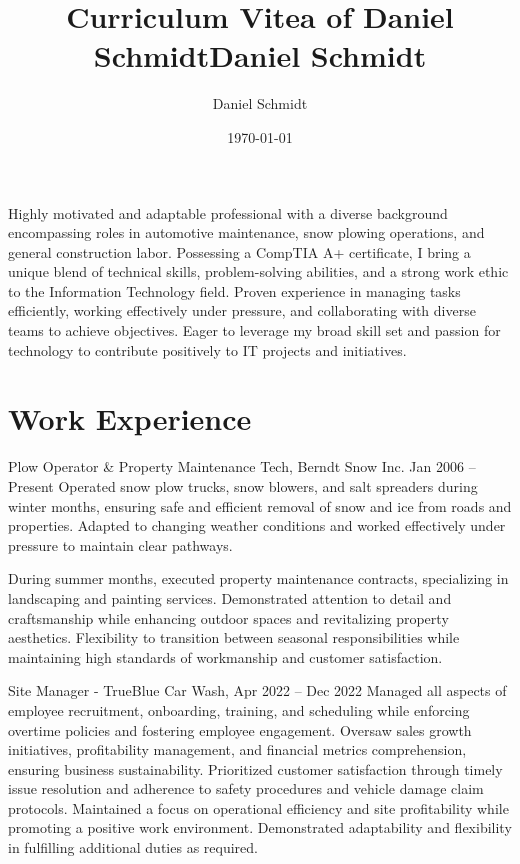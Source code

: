 \documentclass{simplecv}
\title{Curriculum Vitea of Daniel Schmidt}
\author{Daniel Schmidt}
\date{\today}
\begin{document}


\title{Daniel Schmidt}
\maketitle
Highly motivated and adaptable professional with a diverse background encompassing roles in automotive maintenance, snow plowing operations, and general construction labor. Possessing a CompTIA A+ certificate, I bring a unique blend of technical skills, problem-solving abilities, and a strong work ethic to the Information Technology field. Proven experience in managing tasks efficiently, working effectively under pressure, and collaborating with diverse teams to achieve objectives. Eager to leverage my broad skill set and passion for technology to contribute positively to IT projects and initiatives.

\section{Work Experience}
\begin{topic}
\item[Plow Operator \& Property Maintenance Tech, Berndt Snow Inc. Jan 2006 -- Present]
Operated snow plow trucks, snow blowers, and salt spreaders during winter months, ensuring safe and efficient removal of snow and ice from roads and properties. Adapted to changing weather conditions and worked effectively under pressure to maintain clear pathways.

During summer months, executed property maintenance contracts, specializing in landscaping and painting services. Demonstrated attention to detail and craftsmanship while enhancing outdoor spaces and revitalizing property aesthetics. Flexibility to transition between seasonal responsibilities while maintaining high standards of workmanship and customer satisfaction.
\end{topic}

\begin{topic}
\item[Site Manager - TrueBlue Car Wash, Apr 2022 -- Dec 2022]
Managed all aspects of employee recruitment, onboarding, training, and scheduling while enforcing overtime policies and fostering employee engagement. Oversaw sales growth initiatives, profitability management, and financial metrics comprehension, ensuring business sustainability. Prioritized customer satisfaction through timely issue resolution and adherence to safety procedures and vehicle damage claim protocols. Maintained a focus on operational efficiency and site profitability while promoting a positive work environment. Demonstrated adaptability and flexibility in fulfilling additional duties as required.
\end{topic}
\end{document}
